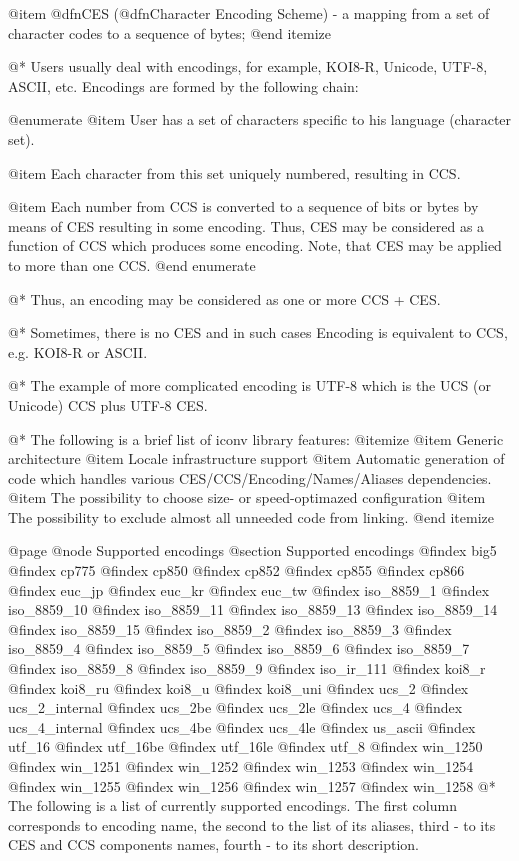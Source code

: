 @item
@dfn{CES} (@dfn{Character Encoding Scheme}) - a mapping from a set of character
codes to a sequence of bytes;
@end itemize

@*
Users usually deal with encodings, for example, KOI8-R, Unicode, UTF-8,
ASCII, etc. Encodings are formed by the following chain:

@enumerate
@item
User has a set of characters specific to his language (character set).

@item
Each character from this set uniquely numbered, resulting in CCS.

@item
Each number from CCS is converted to a sequence of bits or bytes by means
of CES resulting in some encoding. Thus, CES may be considered as a
function of CCS which produces some encoding. Note, that CES may be
applied to more than one CCS.
@end enumerate

@*
Thus, an encoding may be considered as one or more CCS + CES.

@*
Sometimes, there is no CES and in such cases Encoding is equivalent to CCS,
e.g. KOI8-R or ASCII.

@*
The example of more complicated encoding is UTF-8 which is the UCS
(or Unicode) CCS plus UTF-8 CES.

@*
The following is a brief list of iconv library features:
@itemize
@item
Generic architecture
@item
Locale infrastructure support
@item
Automatic generation of code which handles various CES/CCS/Encoding/Names/Aliases
dependencies.
@item
The possibility to choose size- or speed-optimazed configuration
@item
The possibility to exclude almost all unneeded code from linking.
@end itemize




@page
@node Supported encodings
@section Supported encodings
@findex big5
@findex cp775
@findex cp850
@findex cp852
@findex cp855
@findex cp866
@findex euc_jp
@findex euc_kr
@findex euc_tw
@findex iso_8859_1
@findex iso_8859_10
@findex iso_8859_11
@findex iso_8859_13
@findex iso_8859_14
@findex iso_8859_15
@findex iso_8859_2
@findex iso_8859_3
@findex iso_8859_4
@findex iso_8859_5
@findex iso_8859_6
@findex iso_8859_7
@findex iso_8859_8
@findex iso_8859_9
@findex iso_ir_111
@findex koi8_r
@findex koi8_ru
@findex koi8_u
@findex koi8_uni
@findex ucs_2
@findex ucs_2_internal
@findex ucs_2be
@findex ucs_2le
@findex ucs_4
@findex ucs_4_internal
@findex ucs_4be
@findex ucs_4le
@findex us_ascii
@findex utf_16
@findex utf_16be
@findex utf_16le
@findex utf_8
@findex win_1250
@findex win_1251
@findex win_1252
@findex win_1253
@findex win_1254
@findex win_1255
@findex win_1256
@findex win_1257
@findex win_1258
@*
The following is a list of currently supported encodings. The first column
corresponds to encoding name, the second to the list of its aliases, third
- to its CES and CCS components names, fourth - to its short description.

